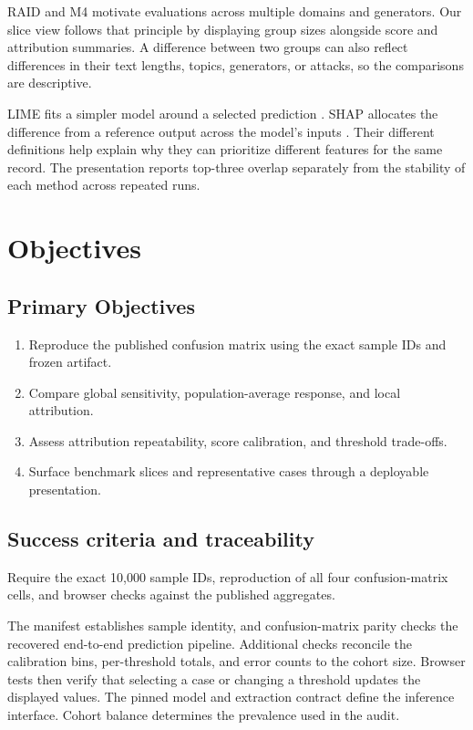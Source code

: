\documentclass[12pt,oneside]{report}
\begin{document}
RAID and M4 motivate evaluations across multiple domains and generators. Our slice view follows that principle by displaying group sizes alongside score and attribution summaries. A difference between two groups can also reflect differences in their text lengths, topics, generators, or attacks, so the comparisons are descriptive.

LIME fits a simpler model around a selected prediction \cite{lime}. SHAP allocates the difference from a reference output across the model's inputs \cite{shap}. Their different definitions help explain why they can prioritize different features for the same record. The presentation reports top-three overlap separately from the stability of each method across repeated runs.
\chapter{Objectives}
\section{Primary Objectives}
\begin{enumerate}
\item Reproduce the published confusion matrix using the exact sample IDs and frozen artifact.
\item Compare global sensitivity, population-average response, and local attribution.
\item Assess attribution repeatability, score calibration, and threshold trade-offs.
\item Surface benchmark slices and representative cases through a deployable presentation.
\end{enumerate}
\section{Success criteria and traceability}
Require the exact 10,000 sample IDs, reproduction of all four confusion-matrix cells, and browser checks against the published aggregates.

The manifest establishes sample identity, and confusion-matrix parity checks the recovered end-to-end prediction pipeline. Additional checks reconcile the calibration bins, per-threshold totals, and error counts to the cohort size. Browser tests then verify that selecting a case or changing a threshold updates the displayed values.
The pinned model and extraction contract define the inference interface. Cohort balance determines the prevalence used in the audit.
\end{document}
